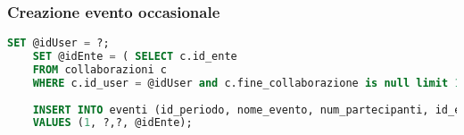 \subsubsection{Creazione evento occasionale}
\begin{lstlisting}[language=SQL]
	SET @idUser = ?;
	SET @idEnte = ( SELECT c.id_ente
	FROM collaborazioni c
	WHERE c.id_user = @idUser and c.fine_collaborazione is null limit 1);
	
	INSERT INTO eventi (id_periodo, nome_evento, num_partecipanti, id_ente) 
	VALUES (1, ?,?, @idEnte);
\end{lstlisting}
